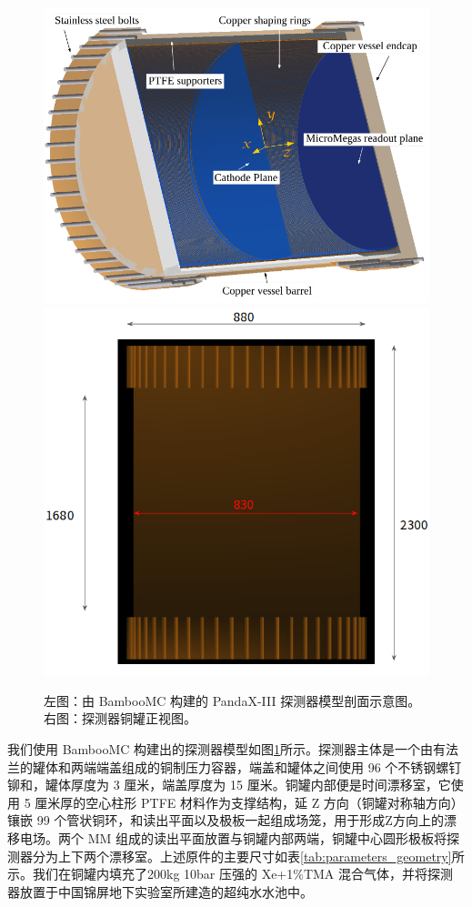 \begin{figure}[tbh]
    \centering
    \includegraphics[width=0.4\columnwidth]{pic/fig3.png}
    \includegraphics[width=0.4\columnwidth]{pic/fig5.png}
    \caption{左图：由 BambooMC 构建的 PandaX-III 探测器模型剖面示意图。右图：探测器铜罐正视图。}
    \label{fig:detector_bamboomc}
\end{figure}

我们使用 BambooMC 构建出的探测器模型如图\ref{fig:detector_bamboomc}所示。探测器主体是一个由有法兰的罐体和两端端盖组成的铜制压力容器，端盖和罐体之间使用 96 个不锈钢螺钉铆和，罐体厚度为 3 厘米，端盖厚度为 15 厘米。铜罐内部便是时间漂移室，它使用 5 厘米厚的空心柱形 PTFE 材料作为支撑结构，延 Z 方向（铜罐对称轴方向）镶嵌 99 个管状铜环，和读出平面以及极板一起组成场笼，用于形成Z方向上的漂移电场。两个 MM 组成的读出平面放置与铜罐内部两端，铜罐中心圆形极板将探测器分为上下两个漂移室。上述原件的主要尺寸如表\ref{tab:parameters_geometry}所示。我们在铜罐内填充了200kg 10bar 压强的 Xe+1\%TMA 混合气体，并将探测器放置于中国锦屏地下实验室所建造的超纯水水池中。

